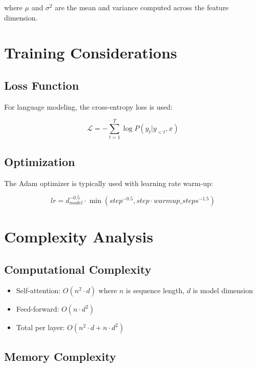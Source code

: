 \documentclass[12pt,a4paper]{article}
\begin{document}
where $\mu$ and $\sigma^2$ are the mean and variance computed across the feature dimension.

\section{Training Considerations}

\subsection{Loss Function}

For language modeling, the cross-entropy loss is used:

\begin{equation}
\mathcal{L} = -\sum_{t=1}^{T} \log P(y_t | y_{<t}, x)
\end{equation}

\subsection{Optimization}

The Adam optimizer is typically used with learning rate warm-up:

\begin{equation}
lr = d_{model}^{-0.5} \cdot \min(step^{-0.5}, step \cdot warmup\_steps^{-1.5})
\end{equation}

\section{Complexity Analysis}

\subsection{Computational Complexity}

\begin{itemize}
    \item Self-attention: $O(n^2 \cdot d)$ where $n$ is sequence length, $d$ is model dimension
    \item Feed-forward: $O(n \cdot d^2)$
    \item Total per layer: $O(n^2 \cdot d + n \cdot d^2)$
\end{itemize}

\subsection{Memory Complexity}
\end{document}
